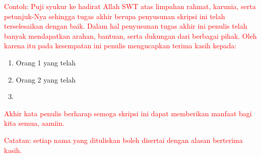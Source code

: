 \textcolor{red}{
Contoh: Puji syukur ke hadirat Allah SWT atas limpahan rahmat, karunia, serta petunjuk-Nya sehingga tugas akhir berupa penyusunan skripsi ini telah terselesaikan dengan baik. Dalam hal penyusunan tugas akhir ini penulis telah banyak mendapatkan arahan, bantuan, serta dukungan dari berbagai pihak. Oleh karena itu pada kesempatan ini penulis mengucapkan terima kasih kepada:}


\begin{enumerate}
	\item Orang 1 yang telah
	
	\item Orang 2 yang telah
		
	\item <isi dengan nama orang lainnya>

\end{enumerate}

\textcolor{red}{Akhir kata penulis berharap semoga skripsi ini dapat memberikan manfaat bagi kita semua, aamiin.}

\noindent\textcolor{red}{Catatan: setiap nama yang dituliskan boleh disertai dengan alasan berterima kasih.}

